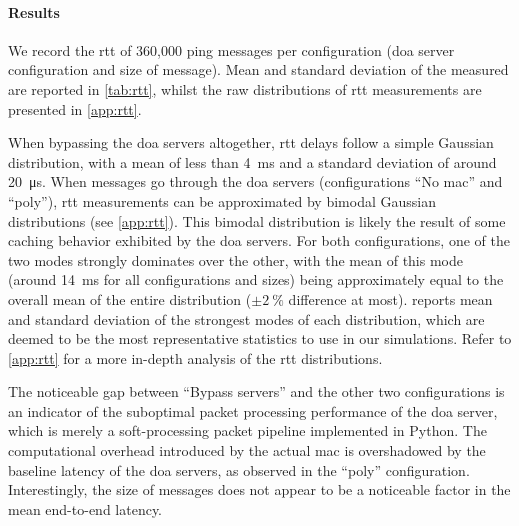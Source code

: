 \paragraph{Results}

We record the \acrlong{rtt} of 360,000 ping messages per configuration (\acrshort{doa} server
configuration and size of message). Mean and standard deviation of the measured  are
reported in \cref{tab:rtt}, whilst the raw distributions of \acrshort{rtt} measurements are
presented in \cref{app:rtt}.

When bypassing the \acrshort{doa} servers altogether, \acrshort{rtt} delays follow a simple Gaussian
distribution, with a mean of less than \qty{4}{\ms} and a standard deviation of around
\qty{20}{\us}. When messages go through the \acrshort{doa} servers (configurations ``No
\acrshort{mac}'' and ``\acrshort{poly}''), \acrshort{rtt} measurements can be approximated by
bimodal Gaussian distributions (see \cref{app:rtt}). This bimodal distribution is likely the result
of some caching behavior exhibited by the \acrshort{doa} servers. For both configurations, one of
the two modes strongly dominates over the other, with the mean of this mode (around \qty{14}{\ms}
for all configurations and sizes) being approximately equal to the overall mean of the entire
distribution ($\pm\qty{2}{\percent}$ difference at most).  reports mean and standard
deviation of the strongest modes of each distribution, which are deemed to be the most
representative statistics to use in our simulations. Refer to \cref{app:rtt} for a more in-depth
analysis of the \acrshort{rtt} distributions.

The noticeable gap between ``Bypass servers'' and the other two configurations is an indicator of
the suboptimal packet processing performance of the \acrshort{doa} server, which is merely a
soft-processing packet pipeline implemented in Python. The computational overhead introduced by the
actual \acrshort{mac} is overshadowed by the baseline latency of the \acrshort{doa} servers, as
observed in the ``\acrshort{poly}'' configuration. Interestingly, the size of messages does not
appear to be a noticeable factor in the mean end-to-end latency.

